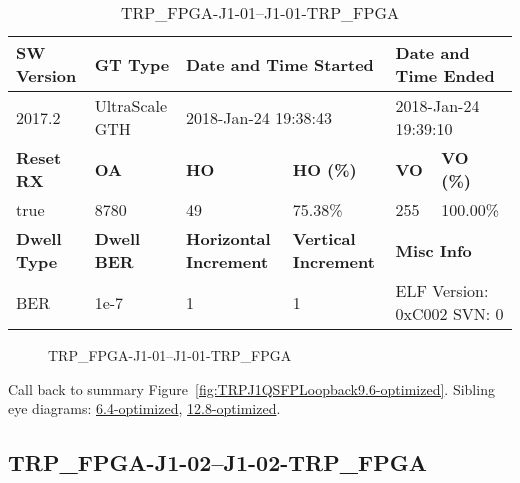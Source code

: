 \begin{table}[h]
\centering
\caption{TRP\_FPGA-J1-01--J1-01-TRP\_FPGA}
\label{tab:TRPFPGAJ101J101TRPFPGA9.6-optimized}
\begin{tabular}{@{}|l|l|l|l|l|l|@{}}
\toprule
\textbf{SW Version}                & \textbf{GT Type}   & \multicolumn{2}{l|}{\textbf{Date and Time Started}}            & \multicolumn{2}{l|}{\textbf{Date and Time Ended}}        \\ \midrule
2017.2                       & UltraScale GTH          & \multicolumn{2}{l|}{2018-Jan-24 19:38:43}                   & \multicolumn{2}{l|}{2018-Jan-24 19:39:10}               \\ \midrule
\textbf{Reset RX}                  & \textbf{OA} & \textbf{HO}   & \textbf{HO (\%)} & \textbf{VO} & \textbf{VO (\%)} \\ \midrule
true & 8780        & 49          & 75.38\%        & 255        & 100.00\%       \\ \midrule
\textbf{Dwell Type}                & \textbf{Dwell BER} & \textbf{Horizontal Increment} & \textbf{Vertical Increment}    & \multicolumn{2}{l|}{\textbf{Misc Info}}                  \\ \midrule
BER                            & 1e-7        & 1        & 1           & \multicolumn{2}{l|}{ELF Version: 0xC002 SVN: 0}                         \\ \bottomrule
\end{tabular}
\end{table}

\begin{figure}[h]
\caption{TRP\_FPGA-J1-01--J1-01-TRP\_FPGA} \label{fig:TRPFPGAJ101J101TRPFPGA9.6-optimized}
\end{figure}

Call back to summary Figure~\ref{fig:TRPJ1QSFPLoopback9.6-optimized}.
Sibling eye diagrams: \hyperref[sec:TRPFPGAJ101J101TRPFPGA6.4-optimized]{6.4-optimized}, \hyperref[sec:TRPFPGAJ101J101TRPFPGA12.8-optimized]{12.8-optimized}.

\clearpage
\newpage


\subsection{TRP\_FPGA-J1-02--J1-02-TRP\_FPGA}\label{sec:TRPFPGAJ102J102TRPFPGA9.6-optimized}

